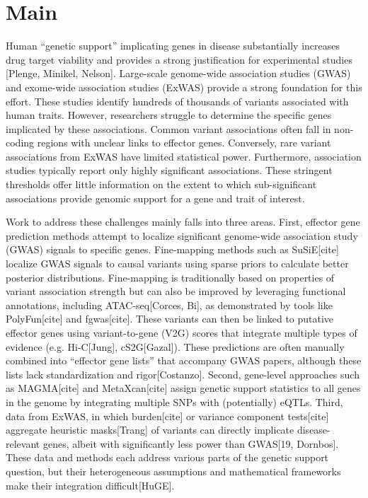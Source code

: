 \section{Main}
\label{sec:main}
Human “genetic support” implicating genes in disease substantially increases drug target viability and provides a strong justification for experimental studies [Plenge, Minikel, Nelson]. Large-scale genome-wide association studies (GWAS) and exome-wide association studies (ExWAS) provide a strong foundation for this effort. These studies identify hundreds of thousands of variants associated with human traits. However, researchers struggle to determine the specific genes implicated by these associations. Common variant associations often fall in non-coding regions with unclear links to effector genes. Conversely, rare variant associations from ExWAS have limited statistical power. Furthermore, association studies typically report only highly significant associations. These stringent thresholds offer little information on the extent to which sub-significant associations provide genomic support for a gene and trait of interest.

Work to address these challenges mainly falls into three areas. First, effector gene prediction methods attempt to localize significant genome-wide association study (GWAS) signals to specific genes. Fine-mapping methods such as SuSiE[cite] localize GWAS signals to causal variants using sparse priors to calculate better posterior distributions. Fine-mapping is traditionally based on properties of variant association strength but can also be improved by leveraging functional annotations, including ATAC-seq[Corces, Bi], as demonstrated by tools like PolyFun[cite] and fgwas[cite]. These variants can then be linked to putative effector genes using variant-to-gene (V2G) scores that integrate multiple types of evidence (e.g. Hi-C[Jung], cS2G[Gazal]). These predictions are often manually combined into “effector gene lists” that accompany GWAS papers, although these lists lack standardization and rigor[Costanzo]. Second, gene-level approaches such as MAGMA[cite] and MetaXcan[cite] assign genetic support statistics to all genes in the genome by integrating multiple SNPs with (potentially) eQTLs. Third, data from ExWAS, in which burden[cite] or variance component tests[cite] aggregate heuristic masks[Trang] of variants can directly implicate disease-relevant genes, albeit with significantly less power than GWAS[19, Dornbos]. These data and methods each address various parts of the genetic support question, but their heterogeneous assumptions and mathematical frameworks make their integration difficult[HuGE].

